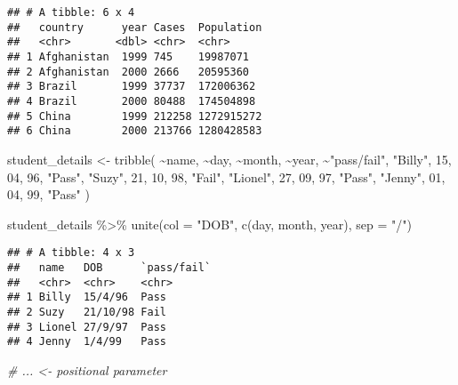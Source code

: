 \documentclass[
]{article}
\newenvironment{Shaded}{\begin{snugshade}}{\end{snugshade}}
\newcommand{\AttributeTok}[1]{\textcolor[rgb]{0.77,0.63,0.00}{#1}}
\newcommand{\CommentTok}[1]{\textcolor[rgb]{0.56,0.35,0.01}{\textit{#1}}}
\newcommand{\DecValTok}[1]{\textcolor[rgb]{0.00,0.00,0.81}{#1}}
\newcommand{\FunctionTok}[1]{\textcolor[rgb]{0.00,0.00,0.00}{#1}}
\newcommand{\NormalTok}[1]{#1}
\newcommand{\OtherTok}[1]{\textcolor[rgb]{0.56,0.35,0.01}{#1}}
\newcommand{\SpecialCharTok}[1]{\textcolor[rgb]{0.00,0.00,0.00}{#1}}
\newcommand{\StringTok}[1]{\textcolor[rgb]{0.31,0.60,0.02}{#1}}
\begin{document}
\begin{verbatim}
## # A tibble: 6 x 4
##   country      year Cases  Population
##   <chr>       <dbl> <chr>  <chr>     
## 1 Afghanistan  1999 745    19987071  
## 2 Afghanistan  2000 2666   20595360  
## 3 Brazil       1999 37737  172006362 
## 4 Brazil       2000 80488  174504898 
## 5 China        1999 212258 1272915272
## 6 China        2000 213766 1280428583
\end{verbatim}

\begin{Shaded}
\begin{Highlighting}[]
\NormalTok{student\_details }\OtherTok{\textless{}{-}} \FunctionTok{tribble}\NormalTok{(}
  \SpecialCharTok{\textasciitilde{}}\NormalTok{name, }\SpecialCharTok{\textasciitilde{}}\NormalTok{day, }\SpecialCharTok{\textasciitilde{}}\NormalTok{month, }\SpecialCharTok{\textasciitilde{}}\NormalTok{year, }\SpecialCharTok{\textasciitilde{}}\StringTok{"pass/fail"}\NormalTok{, }
  \StringTok{"Billy"}\NormalTok{, }\DecValTok{15}\NormalTok{, }\DecValTok{04}\NormalTok{, }\DecValTok{96}\NormalTok{, }\StringTok{"Pass"}\NormalTok{, }
  \StringTok{"Suzy"}\NormalTok{, }\DecValTok{21}\NormalTok{, }\DecValTok{10}\NormalTok{, }\DecValTok{98}\NormalTok{, }\StringTok{"Fail"}\NormalTok{,}
  \StringTok{"Lionel"}\NormalTok{, }\DecValTok{27}\NormalTok{, }\DecValTok{09}\NormalTok{, }\DecValTok{97}\NormalTok{, }\StringTok{"Pass"}\NormalTok{, }
  \StringTok{"Jenny"}\NormalTok{, }\DecValTok{01}\NormalTok{, }\DecValTok{04}\NormalTok{, }\DecValTok{99}\NormalTok{, }\StringTok{"Pass"}
\NormalTok{)}

\NormalTok{student\_details }\SpecialCharTok{\%\textgreater{}\%}
\FunctionTok{unite}\NormalTok{(}\AttributeTok{col =} \StringTok{"DOB"}\NormalTok{,}
      \FunctionTok{c}\NormalTok{(day, month, year),}
      \AttributeTok{sep =} \StringTok{"/"}\NormalTok{)}
\end{Highlighting}
\end{Shaded}

\begin{verbatim}
## # A tibble: 4 x 3
##   name   DOB      `pass/fail`
##   <chr>  <chr>    <chr>      
## 1 Billy  15/4/96  Pass       
## 2 Suzy   21/10/98 Fail       
## 3 Lionel 27/9/97  Pass       
## 4 Jenny  1/4/99   Pass
\end{verbatim}

\begin{Shaded}
\begin{Highlighting}[]
\CommentTok{\# ... \textless{}{-} positional parameter}
\end{Highlighting}
\end{Shaded}
\end{document}
